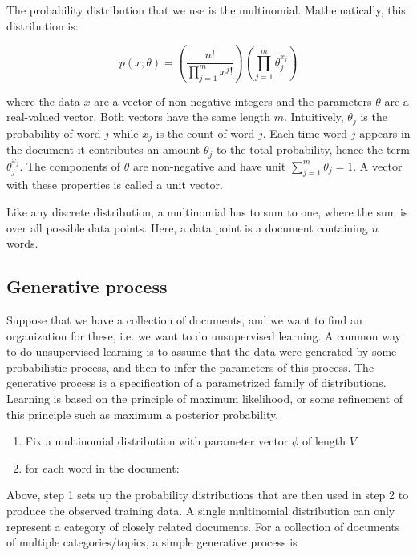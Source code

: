 \documentclass[12pt]{report}
\begin{document}
The probability distribution that we use is the multinomial. 
Mathematically, this distribution is:

\begin{equation}
p(x;\theta) = \left(\frac{n!}{\prod\limits_{j=1}^m x^j!}\right)\left(\prod\limits_{j=1}^m \theta_j^{x_j}\right)
\end{equation}

where the data $x$ are a vector of non-negative integers and the parameters $\theta$ are a real-valued vector. 
Both vectors have the same length $m$. 
Intuitively, $\theta_j$ is the probability of word $j$ while $x_j$ is the count of word $j$. 
Each time word $j$ appears in the document it contributes an amount $\theta_j$ to the total probability, hence the term $\theta_j^{x_j}$. 
The components of $\theta$ are non-negative and have unit $\sum\limits_{j=1}^m \theta_j = 1$. 
A vector with these properties is called a unit vector.

Like any discrete distribution, a multinomial has to sum to one, where the sum is over all possible data points. 
Here, a data point is a document containing $n$ words.


\subsection{Generative process}

Suppose that we have a collection of documents, and we want to find an organization for these, i.e. we want to do unsupervised learning. 
A common way to do unsupervised learning is to assume that the data were generated by some probabilistic process, and then to infer the parameters of this process. 
The generative process is a specification of a parametrized family of distributions. 
Learning is based on the principle of maximum likelihood, or some refinement of this principle such as maximum a posterior probability.


\begin{enumerate}
  \item Fix a multinomial distribution with parameter vector $\phi$ of length $V$
  \item for each word in the document:
\end{enumerate}

Above, step 1 sets up the probability distributions that are then used in step 2 to produce the observed training data. 
A single multinomial distribution can only represent a category of closely related documents. 
For a collection of documents of multiple categories/topics, a simple
generative process is
\end{document}
